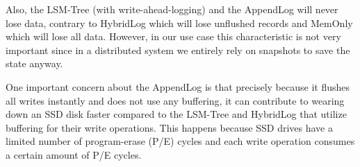 Also, the LSM-Tree (with write-ahead-logging) and the AppendLog will never lose data, contrary to HybridLog which will lose unflushed records and MemOnly which will lose all data. However, in our use case this characteristic is not very important since in a distributed system we entirely rely on snapshots to save the state anyway.

One important concern about the AppendLog is that precisely because it flushes all writes instantly and does not use any buffering, it can contribute to wearing down an SSD disk faster compared to the LSM-Tree and HybridLog that utilize buffering for their write operations. This happens because SSD drives have a limited number of program-erase (P/E) cycles and each write operation consumes a certain amount of P/E cycles.
